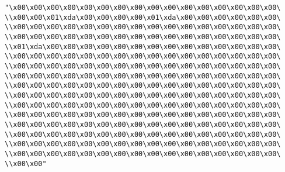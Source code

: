 \verb|"\x00\x00\x00\x00\x00\x00\x00\x00\x00\x00\x00\x00\x00\x00\x00\x00\|\newline
\verb|\\x00\x00\x01\xda\x00\x00\x00\x00\x01\xda\x00\x00\x00\x00\x00\x00\|\newline
\verb|\\x00\x00\x00\x00\x00\x00\x00\x00\x00\x00\x00\x00\x00\x00\x00\x00\|\newline
\verb|\\x00\x00\x00\x00\x00\x00\x00\x00\x00\x00\x00\x00\x00\x00\x00\x00\|\newline
\verb|\\x01\xda\x00\x00\x00\x00\x00\x00\x00\x00\x00\x00\x00\x00\x00\x00\|\newline
\verb|\\x00\x00\x00\x00\x00\x00\x00\x00\x00\x00\x00\x00\x00\x00\x00\x00\|\newline
\verb|\\x00\x00\x00\x00\x00\x00\x00\x00\x00\x00\x00\x00\x00\x00\x00\x00\|\newline
\verb|\\x00\x00\x00\x00\x00\x00\x00\x00\x00\x00\x00\x00\x00\x00\x00\x00\|\newline
\verb|\\x00\x00\x00\x00\x00\x00\x00\x00\x00\x00\x00\x00\x00\x00\x00\x00\|\newline
\verb|\\x00\x00\x00\x00\x00\x00\x00\x00\x00\x00\x00\x00\x00\x00\x00\x00\|\newline
\verb|\\x00\x00\x00\x00\x00\x00\x00\x00\x00\x00\x00\x00\x00\x00\x00\x00\|\newline
\verb|\\x00\x00\x00\x00\x00\x00\x00\x00\x00\x00\x00\x00\x00\x00\x00\x00\|\newline
\verb|\\x00\x00\x00\x00\x00\x00\x00\x00\x00\x00\x00\x00\x00\x00\x00\x00\|\newline
\verb|\\x00\x00\x00\x00\x00\x00\x00\x00\x00\x00\x00\x00\x00\x00\x00\x00\|\newline
\verb|\\x00\x00\x00\x00\x00\x00\x00\x00\x00\x00\x00\x00\x00\x00\x00\x00\|\newline
\verb|\\x00\x00\x00\x00\x00\x00\x00\x00\x00\x00\x00\x00\x00\x00\x00\x00\|\newline
\verb|\\x00\x00"|\newline
